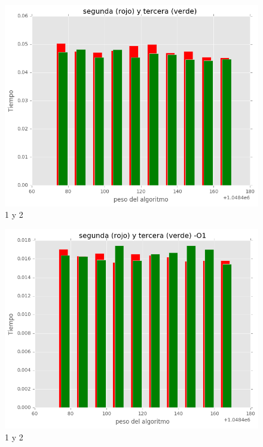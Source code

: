 \documentclass[a4paper, 11pt]{article}
\begin{document}
\begin{figure}[!hbp]
	\includegraphics[scale=0.6]{2y3p.png}
	\caption{1 y 2	\label{2y3p}}
\end{figure} 
\begin{figure}[!hbp]
	\includegraphics[scale=0.6]{2y3_1p.png}
	\caption{1 y 2	\label{2y3_1p}}
\end{figure} 
\end{document}
